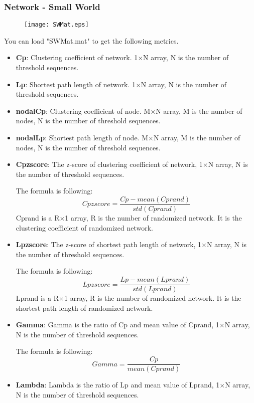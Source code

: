 \documentclass[11pt]{article}
\begin{document}
			\subsubsection{Network - Small World}
				\begin{figure}
					\begin{center}
						\texttt{[image: SWMat.eps]}
					\end{center}
				\end{figure}
				You can load "SWMat.mat" to get the following metrics.
				\begin{itemize}
					\item \textbf{Cp}: Clustering coefficient of network.
						1$\times$N array, N is the number of threshold sequences.
					\item \textbf{Lp}: Shortest path length of network.
						1$\times$N array, N is the number of threshold sequences.
					\item \textbf{nodalCp}: Clustering coefficient of node.
						M$\times$N array, M is the number of nodes, N is the number of threshold sequences.
					\item \textbf{nodalLp}: Shortest path length of node.
						M$\times$N array, M is the number of nodes, N is the number of threshold sequences.
					\item \textbf{Cpzscore}: The z-score of clustering coefficient of network, 
						1$\times$N array, N is the number of threshold sequences.

						The formula is following:
						$$Cpzscore=\frac{Cp-mean(Cprand)}{std(Cprand)}$$
						Cprand is a R$\times$1 array, R is the number of randomized network. 
						It is the clustering coefficient of randomized network.
					\item \textbf{Lpzscore}: The z-score of shortest path length of network,
						1$\times$N array, N is the number of threshold sequences.

						The formula is following:
						$$Lpzscore=\frac{Lp-mean(Lprand)}{std(Lprand)}$$
						Lprand is a R$\times$1 array, R is the number of randomized network. 
						It is the shortest path length of randomized network.
					\item \textbf{Gamma}: Gamma is the ratio of Cp and mean value of Cprand,
						1$\times$N array, N is the number of threshold sequences.
					
						The formula is following:
						$$Gamma=\frac{Cp}{mean(Cprand)}$$
					\item \textbf{Lambda}: Lambda is the ratio of Lp and mean value of Lprand,
						1$\times$N array, N is the number of threshold sequences.
						

\end{itemize}
\end{document}
